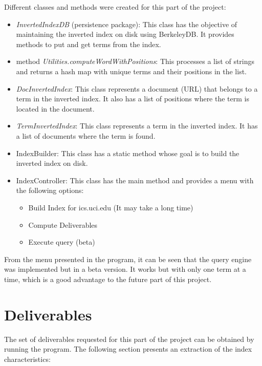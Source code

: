 \documentclass[paper=a4, fontsize=11pt]{scrartcl} %
\numberwithin{equation}{section} %
\numberwithin{table}{section} %
\begin{document}
Different classes and methods were created for this part of the project:
\begin{itemize}
\item \textit{InvertedIndexDB} (persistence package): This class has the objective of maintaining the inverted index on disk using BerkeleyDB. It provides methods to put and get terms from the index.
\item method \textit{Utilities.computeWordWithPositions}: This processes a list of strings and returns a hash map with unique terms and their positions in the list.
\item \textit{DocInvertedIndex}: This class represents a document (URL) that belongs to a term in the inverted index. It also has a list of positions where the term is located in the document.
\item \textit{TermInvertedIndex}: This class represents a term  in the inverted index. It has a list of documents where the term is found.
\item IndexBuilder: This class has a static method whose goal is to build the inverted index on disk.
\item IndexController: This class has the main method and provides a menu with the following options:
\begin{itemize}
\item Build Index for ics.uci.edu (It may take a long time)
\item Compute Deliverables
\item Execute query (beta)
\end{itemize}
\end{itemize}

From the menu presented in the program, it can be seen that the query engine was implemented but in a beta version. It works but with only one term at a time, which is a good advantage to the future part of this project.

\section*{Deliverables}
The set of deliverables requested for this part of the project can be obtained by running the program. The following section presents an extraction of the index characteristics:
\end{document}

